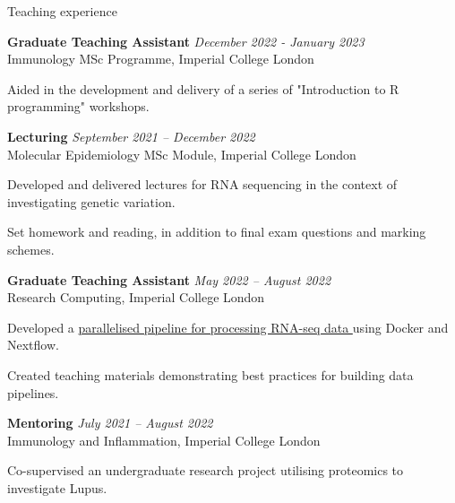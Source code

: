 \documentclass{resume}
\begin{document}
\begin{rSection}{Teaching experience}

\textbf{Graduate Teaching Assistant} \hfill  \textit{December 2022 - January 2023} \\
Immunology MSc Programme, Imperial College London
\vspace{2pt plus 1pt minus 1pt}
\item Aided in the development and delivery of a series of "Introduction to R programming" workshops.

\textbf{Lecturing} \hfill  \textit{September 2021 -- December 2022} \\
Molecular Epidemiology MSc Module, Imperial College London
\vspace{2pt plus 1pt minus 1pt}
\item Developed and delivered lectures for RNA sequencing in the context of investigating genetic variation. 
\item Set homework and reading, in addition to final exam questions and marking schemes.

\pagebreak

\textbf{Graduate Teaching Assistant} \hfill  \textit{May 2022 -- August 2022} \\
Research Computing, Imperial College London
\vspace{2pt plus 1pt minus 1pt}
\item Developed a \href{https://github.com/ImperialCollegeLondon/ReCoDE_rnaseq_pipeline}{parallelised pipeline for processing RNA-seq data \faGithub} using Docker and Nextflow. 
\item Created teaching materials demonstrating best practices for building data pipelines.

\textbf{Mentoring} \hfill  \textit{July 2021 -- August 2022} \\
Immunology and Inflammation, Imperial College London
\vspace{2pt plus 1pt minus 1pt}
\item Co-supervised an undergraduate research project utilising proteomics to investigate Lupus.

\end{rSection}
\end{document}
